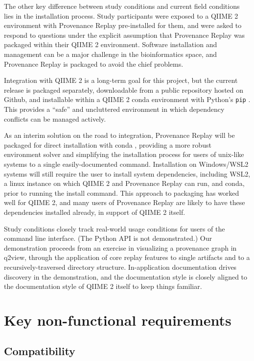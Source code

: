 The other key difference between study conditions and current field conditions
lies in the installation process. Study participants were exposed to a QIIME 2
environment with Provenance Replay pre-installed for them, and were asked to
respond to questions under the explicit assumption that Provenance Replay was
packaged within their QIIME 2 environment. Software installation and management
can be a major challenge in the bioinformatics space, and Provenance Replay is
packaged to avoid the chief problems.

Integration with QIIME 2 is a long-term goal for this project, but the current
release is packaged separately, downloadable from a public repository hosted on
Github, and installable within a QIIME 2 conda environment with Python’s
\texttt{pip} \parencite{the_pip_developers_pip_2008}. This provides a “safe” and
uncluttered environment in which dependency conflicts can be managed actively.

As an interim solution on the road to integration, Provenance Replay will be
packaged for direct installation with conda \parencite{anaconda_inc_anaconda_2022},
providing a more robust environment solver and simplifying the installation
process for users of unix-like systems to a single easily-documented command.
Installation on Windows/WSL2 systems will still require the user to install
system dependencies, including WSL2, a linux instance on which QIIME 2 and
Provenance Replay can run, and conda, prior to running the install command. This
approach to packaging has worked well for QIIME 2, and many users of Provenance
Replay are likely to have these dependencies installed already, in support of
QIIME 2 itself.

Study conditions closely track real-world usage conditions for users of the
command line interface. (The Python API is not demonstrated.) Our demonstration
proceeds from an exercise in visualizing a provenance graph in q2view, through
the application of core replay features to single artifacts and to a
recursively-traversed directory structure. In-application documentation drives
discovery in the demonstration, and the documentation style is closely aligned
to the documentation style of QIIME 2 itself to keep things familiar. 

\section{Key non-functional requirements}

\subsection{Compatibility}

